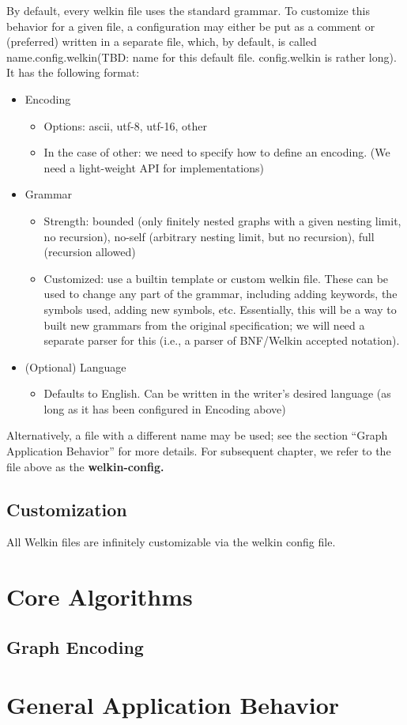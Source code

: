 By default, every welkin file uses the standard grammar. To customize this behavior for a given file, a configuration may either be put as a comment or (preferred) written in a separate file, which, by default, is called name.config.welkin(TBD: name for this default file. config.welkin is rather long). It has the following format:
\begin{itemize}
	\item Encoding
				\begin{itemize}
					\item Options: ascii, utf-8, utf-16, other
					\item In the case of other: we need to specify how to define an encoding. (We need a light-weight API for implementations)
				\end{itemize}
	\item Grammar
				\begin{itemize}
					\item Strength: bounded (only finitely nested graphs with a given nesting limit, no recursion), no-self (arbitrary nesting limit, but no recursion), full (recursion allowed)
					\item Customized: use a builtin template or custom welkin file. These can be used to change any part of the grammar, including adding keywords, the symbols used, adding new symbols, etc. Essentially, this will be a way to built new grammars from the original specification; we will need a separate parser for this (i.e., a parser of BNF/Welkin accepted notation).
				\end{itemize}

	\item (Optional) Language
				\begin{itemize}
					\item Defaults to English. Can be written in the writer's desired language (as long as it has been configured in Encoding above)
				\end{itemize}
\end{itemize}

Alternatively, a file with a different name may be used; see the section ``Graph Application Behavior'' for more details. For subsequent chapter, we refer to the file above as the \textbf{welkin-config.}

\subsection{Customization}
All Welkin files are infinitely customizable via the welkin config file.


\section{Core Algorithms}

\subsection{Graph Encoding}

\section{General Application Behavior}




\label{ch:spec}
